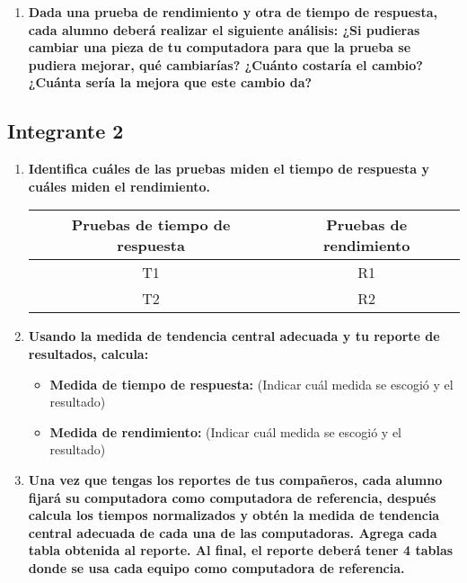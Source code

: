 \documentclass[12pt]{article}
\newcommand{\pl}[1]{\item \textbf{ #1 }}
\begin{document}
\begin{enumerate}[label=(\arabic{section}.\arabic{subsection}.\arabic{enumi})]
    \pl{Dada una prueba de rendimiento y otra de tiempo de respuesta, cada alumno deberá realizar el siguiente análisis: ¿Si pudieras cambiar una pieza de tu computadora para que la prueba se pudiera mejorar, qué cambiarías? ¿Cuánto costaría el cambio? ¿Cuánta sería la mejora que este cambio da?}

\end{enumerate}

\subsection{Integrante 2}

\begin{enumerate}[label=(\arabic{section}.\arabic{subsection}.\arabic{enumi})]
    \pl{Identifica cuáles de las pruebas miden el tiempo de respuesta y cuáles miden el rendimiento.}
    \begin{table}[htb]
        \centering
        \begin{tabular}{|c|c|}
        \hline
        Pruebas de tiempo de respuesta & Pruebas de rendimiento \\
        \hline
        T1 & R1 \\
        \hline
        T2 & R2 \\
        \hline
        \end{tabular}
    \end{table}\par

    \pl{Usando la medida de tendencia central adecuada y tu reporte de resultados, calcula:}
    \begin{itemize}
        \pl{Medida de tiempo de respuesta:}(Indicar cuál medida se escogió y el resultado)\par
    
        \pl{Medida de rendimiento:} (Indicar cuál medida se escogió y el resultado)\par
    \end{itemize}

    \pl{Una vez que tengas los reportes de tus compañeros, cada alumno fijará su computadora como computadora de referencia, después calcula los tiempos normalizados y obtén la medida de tendencia central adecuada de cada una de las computadoras. Agrega cada tabla obtenida al reporte. Al final, el reporte deberá tener 4 tablas donde se usa cada equipo como computadora de referencia.}


\end{enumerate}
\end{document}
